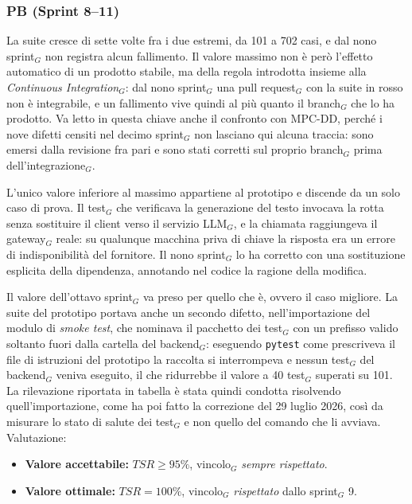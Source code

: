 \documentclass[a4paper, 10pt, colorlinks=true, linkcolor=black, urlcolor=blue, citecolor=blue, hidelinks]{article}
\begin{document}
\subsubsection{PB (Sprint 8--11)}
La suite cresce di sette volte fra i due estremi, da 101 a 702 casi, e dal nono sprint$_G$ non registra alcun fallimento. Il valore massimo non è però l'effetto automatico di un prodotto stabile, ma della regola introdotta insieme alla \textit{Continuous Integration}$_G$: dal nono sprint$_G$ una pull request$_G$ con la suite in rosso non è integrabile, e un fallimento vive quindi al più quanto il branch$_G$ che lo ha prodotto. Va letto in questa chiave anche il confronto con MPC-DD, perché i nove difetti censiti nel decimo sprint$_G$ non lasciano qui alcuna traccia: sono emersi dalla revisione fra pari e sono stati corretti sul proprio branch$_G$ prima dell'integrazione$_G$.

L'unico valore inferiore al massimo appartiene al prototipo e discende da un solo caso di prova. Il test$_G$ che verificava la generazione del testo invocava la rotta senza sostituire il client verso il servizio LLM$_G$, e la chiamata raggiungeva il gateway$_G$ reale: su qualunque macchina priva di chiave la risposta era un errore di indisponibilità del fornitore. Il nono sprint$_G$ lo ha corretto con una sostituzione esplicita della dipendenza, annotando nel codice la ragione della modifica.

Il valore dell'ottavo sprint$_G$ va preso per quello che è, ovvero il caso migliore. La suite del prototipo portava anche un secondo difetto, nell'importazione del modulo di \textit{smoke test}, che nominava il pacchetto dei test$_G$ con un prefisso valido soltanto fuori dalla cartella del backend$_G$: eseguendo \texttt{pytest} come prescriveva il file di istruzioni del prototipo la raccolta si interrompeva e nessun test$_G$ del backend$_G$ veniva eseguito, il che ridurrebbe il valore a 40 test$_G$ superati su 101. La rilevazione riportata in tabella è stata quindi condotta risolvendo quell'importazione, come ha poi fatto la correzione del 29 luglio 2026, così da misurare lo stato di salute dei test$_G$ e non quello del comando che li avviava. Valutazione:
\begin{itemize}
    \item \textbf{Valore accettabile:} $TSR \geq 95\%$, vincolo$_G$ \textit{sempre rispettato}.
    \item \textbf{Valore ottimale:} $TSR = 100\%$, vincolo$_G$ \textit{rispettato} dallo sprint$_G$ 9.
\end{itemize}
\end{document}

